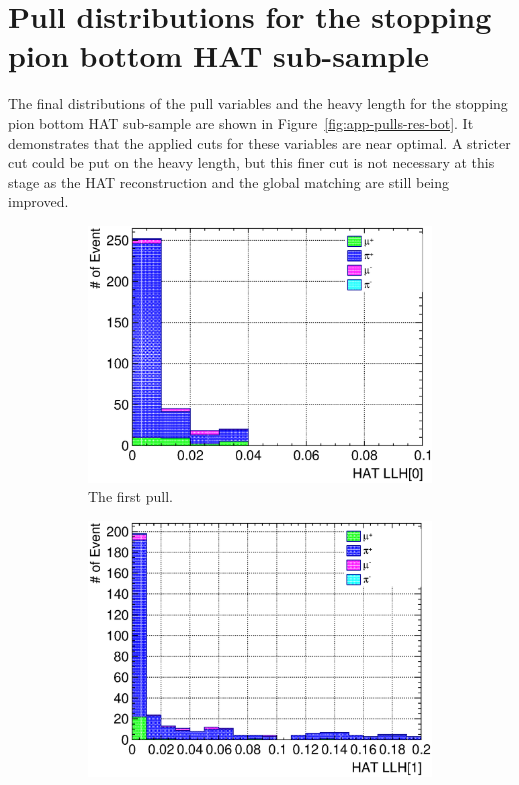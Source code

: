 \section{Pull distributions for the stopping pion bottom HAT sub-sample}
\label{sec:app-bot-pulls}
The final distributions of the pull variables and the heavy length for the stopping pion bottom HAT sub-sample are shown in Figure~\ref{fig:app-pulls-res-bot}.
It demonstrates that the applied cuts for these variables are near optimal.
A stricter cut could be put on the heavy length, but this finer cut is not necessary at this stage as the HAT reconstruction and the global matching are still being improved.
\begin{figure}
  \centering
  \begin{subfigure}{\dbfigwid\textwidth}
       \includegraphics[width=\textwidth]{figures/sel/sspi_BOT_hat_pid0_stack_al6_zoom.eps}
       \caption{The first pull.}
       \label{subfig:sppi-pulls-1-res-bot}
  \end{subfigure}
  \begin{subfigure}{\dbfigwid\textwidth}
       \includegraphics[width=\textwidth]{figures/sel/sspi_BOT_hat_pid1_stack_al6_zoom.eps}

\end{subfigure}
\end{figure}
